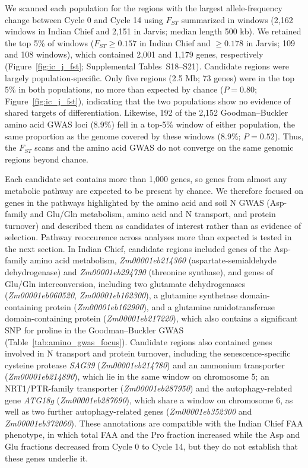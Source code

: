 \documentclass[namedate,unnumsec,webpdf,contemporary,large]{oup-authoring-template}
\begin{document}
We scanned each population for the regions with the largest allele-frequency change between Cycle 0 and Cycle 14 using $F_{ST}$ summarized in windows (2,162 windows in Indian Chief and 2,151 in Jarvis; median length 500 kb). We retained the top 5\% of windows ($F_{ST} \ge 0.157$ in Indian Chief and $\ge 0.178$ in Jarvis; 109 and 108 windows), which contained 2,001 and 1,179 genes, respectively (Figure~\ref{fig:ic_j_fst}; Supplemental Tables~S18--S21). Candidate regions were largely population-specific. Only five regions (2.5 Mb; 73 genes) were in the top 5\% in both populations, no more than expected by chance ($P = 0.80$; Figure~\ref{fig:ic_j_fst}), indicating that the two populations show no evidence of shared targets of differentiation. Likewise, 192 of the 2,152 Goodman--Buckler amino acid GWAS loci (8.9\%) fell in a top-5\% window of either population, the same proportion as the genome covered by these windows (8.9\%; $P = 0.52$). Thus, the $F_{ST}$ scans and the amino acid GWAS do not converge on the same genomic regions beyond chance.

Each candidate set contains more than 1,000 genes, so genes from almost any metabolic pathway are expected to be present by chance. We therefore focused on genes in the pathways highlighted by the amino acid and soil N GWAS (Asp-family and Glu/Gln metabolism, amino acid and N transport, and protein turnover) and described them as candidates of interest rather than as evidence of selection. Pathway reoccurence across analyses more than expected is tested in the next section. In Indian Chief, candidate regions included genes of the Asp-family amino acid metabolism, \textit{Zm00001eb214360} (aspartate-semialdehyde dehydrogenase) and \textit{Zm00001eb294790} (threonine synthase), and genes of Glu/Gln interconversion, including two glutamate dehydrogenases (\textit{Zm00001eb060520}, \textit{Zm00001eb162300}), a glutamine synthetase domain-containing protein (\textit{Zm00001eb162900}), and a glutamine amidotransferase domain-containing protein (\textit{Zm00001eb217220}), which also contains a significant SNP for proline in the Goodman--Buckler GWAS (Table~\ref{tab:amino_gwas_focus}). Candidate regions also contained genes involved in N transport and protein turnover, including the senescence-specific cysteine protease \textit{SAG39} (\textit{Zm00001eb214780}) and an ammonium transporter (\textit{Zm00001eb214890}), which lie in the same window on chromosome 5; an NRT1/PTR-family transporter (\textit{Zm00001eb287950}) and the autophagy-related gene \textit{ATG18g} (\textit{Zm00001eb287690}), which share a window on chromosome 6, as well as two further autophagy-related genes (\textit{Zm00001eb352300} and \textit{Zm00001eb372060}). These annotations are compatible with the Indian Chief FAA phenotype, in which total FAA and the Pro fraction increased while the Asp and Glu fractions decreased from Cycle 0 to Cycle 14, but they do not establish that these genes underlie it.
\end{document}
